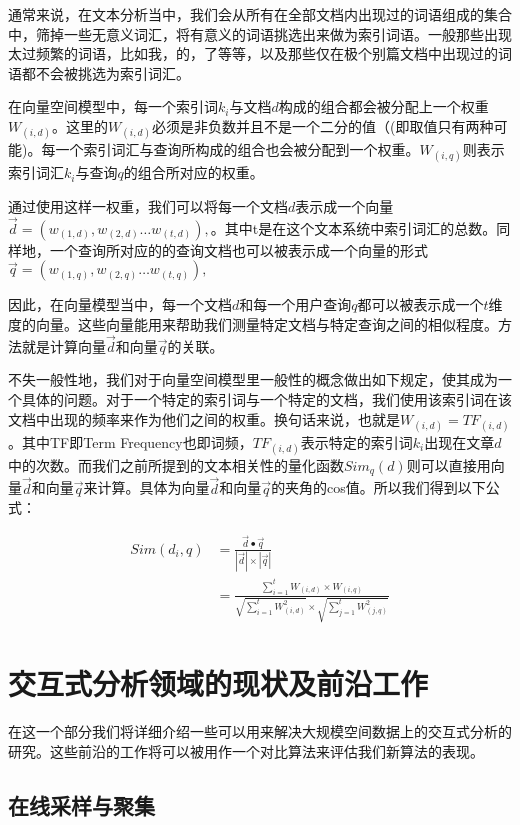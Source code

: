 通常来说，在文本分析当中，我们会从所有在全部文档内出现过的词语组成的集合中，筛掉一些无意义词汇，将有意义的词语挑选出来做为索引词语。一般那些出现太过频繁的词语，比如我，的，了等等，以及那些仅在极个别篇文档中出现过的词语都不会被挑选为索引词汇。

在向量空间模型中，每一个索引词$k_i$与文档$d$构成的组合都会被分配上一个权重$W_(i,d)$。这里的$W_(i,d)$必须是非负数并且不是一个二分的值（(即取值只有两种可能)。每一个索引词汇与查询所构成的组合也会被分配到一个权重。$W_(i,q)$则表示索引词汇$k_i$与查询$q$的组合所对应的权重。

通过使用这样一权重，我们可以将每一个文档$d$表示成一个向量$\vec{d} = (w_(1,d),w_(2,d)\dots w_(t,d)),$。其中t是在这个文本系统中索引词汇的总数。同样地，一个查询所对应的的查询文档也可以被表示成一个向量的形式$\vec{q} = (w_(1,q),w_(2,q)\dots w_(t,q)),$

因此，在向量模型当中，每一个文档$d$和每一个用户查询$q$都可以被表示成一个$t$维度的向量。这些向量能用来帮助我们测量特定文档与特定查询之间的相似程度。方法就是计算向量$\vec{d}$和向量$\vec{q}$的关联。

不失一般性地，我们对于向量空间模型里一般性的概念做出如下规定，使其成为一个具体的问题。对于一个特定的索引词与一个特定的文档，我们使用该索引词在该文档中出现的频率来作为他们之间的权重。换句话来说，也就是$W_(i,d) = TF_(i,d)$。其中TF即Term Frequency也即词频，$TF_(i,d)$表示特定的索引词$k_i$出现在文章$d$中的次数。而我们之前所提到的文本相关性的量化函数$Sim_q(d)$则可以直接用向量$\vec{d}$和向量$\vec{q}$来计算。具体为向量$\vec{d}$和向量$\vec{q}$的夹角的cos值。所以我们得到以下公式：



\begin{equation}
\begin{split}
Sim(d_i,q)&= \frac{\vec{d} \bullet \vec{q}}{|\vec{d}| \times |\vec{q}|}\\
&=\frac{\sum_{i=1}^{t}W_(i,d) \times W_(i,q)}{\sqrt{\sum_{i=1}^{t}W_(i,d)^2} \times \sqrt{\sum_{j=1}^{t}W_(j,q)^2}}
\end{split}
\end{equation}

\section{交互式分析领域的现状及前沿工作}

在这一个部分我们将详细介绍一些可以用来解决大规模空间数据上的交互式分析的研究。这些前沿的工作将可以被用作一个对比算法来评估我们新算法的表现。

\subsection{在线采样与聚集}

